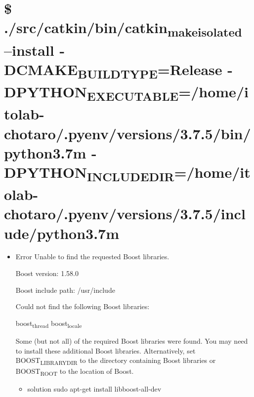 \documentclass[11pt]{article}
\begin{document}
\section{\$ ./src/catkin/bin/catkin\textsubscript{make}\textsubscript{isolated} --install -DCMAKE\textsubscript{BUILD}\textsubscript{TYPE}=Release -DPYTHON\textsubscript{EXECUTABLE}=/home/itolab-chotaro/.pyenv/versions/3.7.5/bin/python3.7m -DPYTHON\textsubscript{INCLUDE}\textsubscript{DIR}=/home/itolab-chotaro/.pyenv/versions/3.7.5/include/python3.7m}
\label{sec:orgc775d1b}
\begin{itemize}
\item Error
Unable to find the requested Boost libraries.

Boost version: 1.58.0

Boost include path: /usr/include

Could not find the following Boost libraries:

boost\textsubscript{thread}
boost\textsubscript{locale}

Some (but not all) of the required Boost libraries were found.  You may
need to install these additional Boost libraries.  Alternatively, set
BOOST\textsubscript{LIBRARYDIR} to the directory containing Boost libraries or BOOST\textsubscript{ROOT}
to the location of Boost.

\begin{itemize}
\item solution
sudo apt-get install libboost-all-dev
\end{itemize}
\end{itemize}
\end{document}
